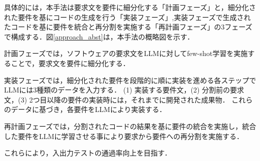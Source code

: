 \documentclass[submit,techrep,noauthor]{ipsj}
\newcommand{\todo}[1]{\colorbox{yellow}{{\bf TODO}:}{\color{red} {\textbf{[#1]}}}}
\begin{document}
具体的には，本手法は要求文を要件に細分化する「計画フェーズ」と，細分化された要件を基にコードの生成を行う「実装フェーズ」,実装フェーズで生成されたコードを基に要件を統合と再分割を実施する「再計画フェーズ」の3フェーズで構成する．図\ref{approach_abst}は，本手法の概略図を示す．

計画フェーズでは，ソフトウェアの要求文をLLMに対してfew-shot学習を実施することで，要求文を要件に細分化する．

実装フェーズでは，細分化された要件を段階的に順に実装を進める各ステップでLLMには3種類のデータを入力する．
(1) 実装する要件文，(2) 分割前の要求文，(3) 2つ目以降の要件の実装時には，それまでに開発された成果物．
これらのデータに基づき，各要件をLLMにより実装する．

再計画フェーズでは，分割されたコードの結果を基に要件の統合を実施し，統合した要件をLLMに学習させる事により要求から要件への再分割を実施する．

これらにより，入出力テストの通過率向上を目指す．






\end{document}
